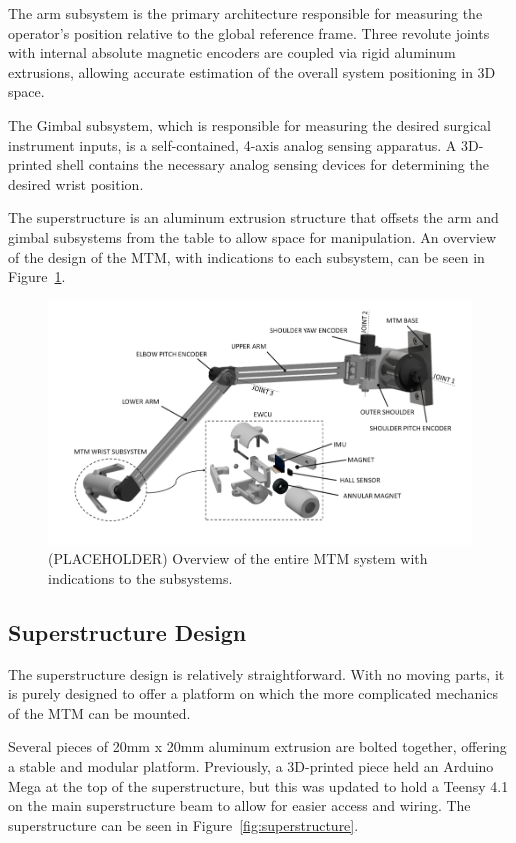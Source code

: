 The arm subsystem is the primary architecture responsible for measuring the operator's position relative to the global reference frame. Three revolute joints with internal absolute magnetic encoders are coupled via rigid aluminum extrusions, allowing accurate estimation of the overall system positioning in 3D space.

The Gimbal subsystem, which is responsible for measuring the desired surgical instrument inputs, is a self-contained, 4-axis analog sensing apparatus. A 3D-printed shell contains the necessary analog sensing devices for determining the desired wrist position.

The superstructure is an aluminum extrusion structure that offsets the arm and gimbal subsystems from the table to allow space for manipulation. An overview of the design of the MTM, with indications to each subsystem, can be seen in Figure~\ref{fig:mtm_overview}.

\begin{figure}[htb!] %
    \centering
    \includegraphics[width=1.0\linewidth]{figures/mtm_overview.png}
    \caption{(PLACEHOLDER) Overview of the entire MTM system with indications to the subsystems.}
    \label{fig:mtm_overview}
\end{figure}

\subsection{Superstructure Design}

The superstructure design is relatively straightforward. With no moving parts, it is purely designed to offer a platform on which the more complicated mechanics of the MTM can be mounted.

Several pieces of 20mm x 20mm aluminum extrusion are bolted together, offering a stable and modular platform. Previously, a 3D-printed piece held an Arduino Mega at the top of the superstructure, but this was updated to hold a Teensy 4.1 on the main superstructure beam to allow for easier access and wiring. The superstructure can be seen in Figure~\ref{fig:superstructure}.

